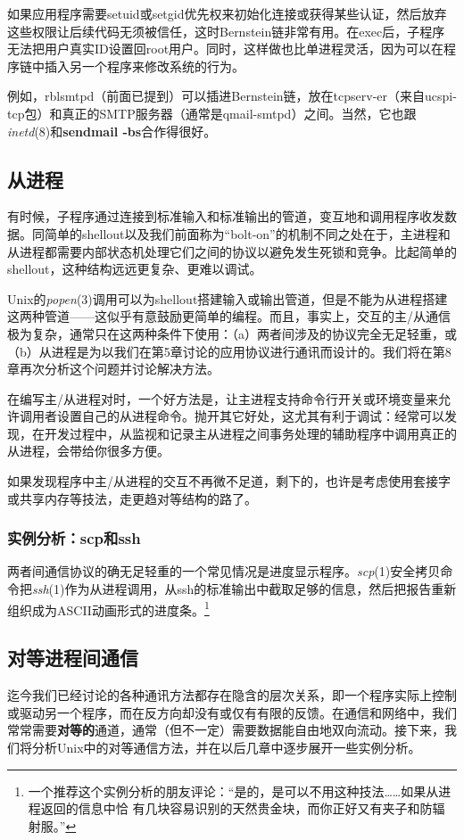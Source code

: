 \documentclass[12pt,oneside]{ctexbook}
\begin{document}
\begin{common-format}
如果应用程序需要setuid或setgid优先权来初始化连接或获得某些认证，然后放弃这些权限让后续代码无须被信任，这时Bernstein链非常有用。在exec后，子程序无法把用户真实ID设置回root用户。同时，这样做也比单进程灵活，因为可以在程序链中插入另一个程序来修改系统的行为。

例如，rblsmtpd（前面已提到）可以插进Bernstein链，放在tcpserv-er（来自ucspi-tcp包）和真正的SMTP服务器（通常是qmail-smtpd）之间。当然，它也跟\textit{inetd}(8)和\textbf{sendmail -bs}合作得很好。


\subsection{从进程}
有时候，子程序通过连接到标准输入和标准输出的管道，变互地和调用程序收发数据。同简单的shellout以及我们前面称为“bolt-on”的机制不同之处在于，主进程和从进程都需要内部状态机处理它们之间的协议以避免发生死锁和竞争。比起简单的shellout，这种结构远远更复杂、更难以调试。

Unix的\textit{popen}(3)调用可以为shellout搭建输入或输出管道，但是不能为从进程搭建这两种管道——这似乎有意鼓励更简单的编程。而且，事实上，交互的主/从通信极为复杂，通常只在这两种条件下使用：（a）两者间涉及的协议完全无足轻重，或（b）从进程是为以我们在第5章讨论的应用协议进行通讯而设计的。我们将在第8章再次分析这个问题并讨论解决方法。

在编写主/从进程对时，一个好方法是，让主进程支持命令行开关或环境变量来允许调用者设置自己的从进程命令。抛开其它好处，这尤其有利于调试：经常可以发现，在开发过程中，从监视和记录主从进程之间事务处理的辅助程序中调用真正的从进程，会带给你很多方便。

如果发现程序中主/从进程的交互不再微不足道，剩下的，也许是考虑使用套接字或共享内存等技法，走更趋对等结构的路了。


\subsubsection{实例分析：scp和ssh}
两者间通信协议的确无足轻重的一个常见情况是进度显示程序。\textit{scp}(1)安全拷贝命令把\textit{ssh}(1)作为从进程调用，从ssh的标准输出中截取足够的信息，然后把报告重新组织成为ASCII动画形式的进度条。\footnote{一个推荐这个实例分析的朋友评论：“是的，是可以不用这种技法……如果从进程返回的信息中恰
有几块容易识别的天然贵金块，而你正好又有夹子和防辐射服。”}


\subsection{对等进程间通信}
迄今我们已经讨论的各种通讯方法都存在隐含的层次关系，即一个程序实际上控制或驱动另一个程序，而在反方向却没有或仅有有限的反馈。在通信和网络中，我们常常需要\textbf{对等的}通道，通常（但不一定）需要数据能自由地双向流动。接下来，我们将分析Unix中的对等通信方法，并在以后几章中逐步展开一些实例分析。



\end{common-format}
\end{document}
